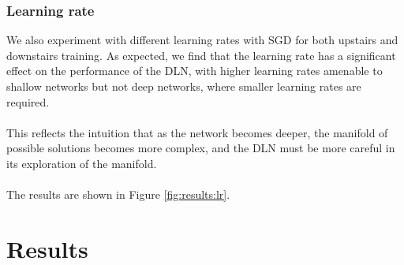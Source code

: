 \documentclass[11pt]{article}
\begin{document}
\subsubsection{Learning rate}
We also experiment with different learning rates with SGD for both upstairs and downstairs training. As expected, we find that the learning rate has a significant effect on the performance of the DLN, with higher learning rates amenable to shallow networks but not deep networks, where smaller learning rates are required.
\\\\
This reflects the intuition that as the network becomes deeper, the manifold of possible solutions becomes more complex, and the DLN must be more careful in its exploration of the manifold.
\\\\
The results are shown in Figure \ref{fig:results:lr}.



\pagebreak

\section{Results}
\end{document}
